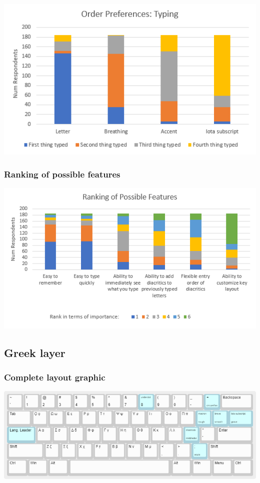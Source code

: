 \documentclass[11pt]{article}
\begin{document}
\begin{center}
\includegraphics[width=.9\linewidth]{./images/diacritic-entry-order-typing.PNG}
\end{center}

\subsubsection{Ranking of possible features}
\label{sec:org4dca7a6}

\begin{center}
\includegraphics[width=.9\linewidth]{./images/ranking-of-possible-features.PNG}
\end{center}

\subsection{Greek layer}
\label{sec:org2f5c5dd}

\subsubsection{Complete layout graphic}
\label{sec:org744d84a}

\begin{center}
\includegraphics[width=.9\linewidth]{./images/greek-layer.png}
\end{center}
\end{document}
